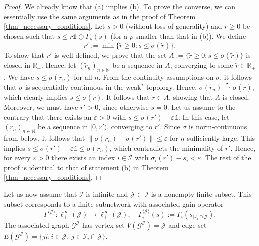 \documentclass[10pt, oneside, a4paper]{article}
\newcommand{\N}{\mathbb{N}}
\newcommand{\R}{\mathbb{R}}
\newcommand{\ep}{\varepsilon}
\newcommand{\unit}{\mathds{1}}
\newcommand{\GC}{\mathcal{G}}
\newcommand{\IC}{\mathcal{I}}
\newcommand{\JC}{\mathcal{J}}
\begin{document}
\begin{proof}
We already know that (a) implies (b). To prove the converse, we can essentially use the same arguments as in the proof of Theorem \ref{thm_necessary_conditions}. Let $s > 0$ (without loss of generality) and $r \geq 0$ be chosen such that $s \leq r\unit \oplus \Gamma_{\rho}(s)$ (for a $\rho$ smaller than that in (b)). We define%
\begin{equation*}
  r' := \min\{ \tilde{r} \geq 0 : s \leq \sigma(\tilde{r}) \}.%
\end{equation*}
To show that $r'$ is well-defined, we prove that the set $A := \{\tilde{r} \geq 0 : s \leq \sigma(\tilde{r})\}$ is closed in $\R_+$. Hence, let $(\tilde{r}_n)_{n\in\N}$ be a sequence in $A$, converging to some $\tilde{r} \in \R_+$. We have $s \leq \sigma(\tilde{r}_n)$ for all $n$. From the continuity assumptions on $\sigma$, it follows that $\sigma$ is sequentially continuous in the weak$^*$-topology. Hence, $\sigma(\tilde{r}_n) \stackrel{\star}{\rightharpoonup} \sigma(\tilde{r})$, which clearly implies $s \leq \sigma(\tilde{r})$. It follows that $\tilde{r} \in A$, showing that $A$ is closed. Moreover, we must have $r' > 0$, since otherwise $s = 0$. Let us assume to the contrary that there exists an $\ep > 0$ with $s \leq \sigma(r') - \ep\unit$. In this case, let $(r_n)_{n\in\N}$ be a sequence in $[0,r')$, converging to $r'$. Since $\sigma$ is norm-continuous from below, it follows that $\|\sigma(r_n) - \sigma(r')\| \leq \ep$ for $n$ sufficiently large. This implies $s \leq \sigma(r') - \ep\unit \leq \sigma(r_n)$, which contradicts the minimality of $r'$. Hence, for every $\ep > 0$ there exists an index $i \in \IC$ with $\sigma_i(r') - s_i < \ep$. The rest of the proof is identical to that of statement (b) in Theorem \ref{thm_necessary_conditions}.
\end{proof}

Let us now assume that $\IC$ is infinite and $\JC \subset \IC$ is a nonempty finite subset. This subset corresponds to a finite subnetwork with associated gain operator%
\begin{equation*}
  \Gamma^{\langle\JC\rangle}:\ell^{\infty}_+(\JC) \rightarrow \ell^{\infty}_+(\JC),\quad \Gamma^{\langle \JC \rangle}_i(s) := \Gamma_i(s_{|\IC_i \cap \JC}).%
\end{equation*}
The associated graph $\GC^{\JC}$ has vertex set $V(\GC^{\JC}) = \JC$ and edge set $E(\GC^{\JC}) = \{ ji : i \in \JC,\ j \in \IC_i \cap \JC \}$.%
\end{document}
